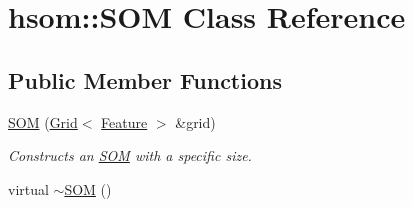 \hypertarget{classhsom_1_1_s_o_m}{\section{hsom\-:\-:\-S\-O\-M \-Class \-Reference}
\label{classhsom_1_1_s_o_m}
}
\subsection*{\-Public \-Member \-Functions}
\begin{DoxyCompactItemize}
\item 
\hyperlink{classhsom_1_1_s_o_m_ab4b14f1b6e57fe03a7adadf17a9b795c}{\-S\-O\-M} (\hyperlink{classhsom_1_1_grid}{\-Grid}$<$ \hyperlink{classhsom_1_1_feature}{\-Feature} $>$ \&grid)
\begin{DoxyCompactList}\small\item\em \-Constructs an \hyperlink{classhsom_1_1_s_o_m}{\-S\-O\-M} with a specific size. \end{DoxyCompactList}\item 
\hypertarget{classhsom_1_1_s_o_m_af57a10bef7963dda7075084eee9863cd}{virtual \hyperlink{classhsom_1_1_s_o_m_af57a10bef7963dda7075084eee9863cd}{$\sim$\-S\-O\-M} ()}\label{classhsom_1_1_s_o_m_af57a10bef7963dda7075084eee9863cd}


\end{DoxyCompactItemize}
